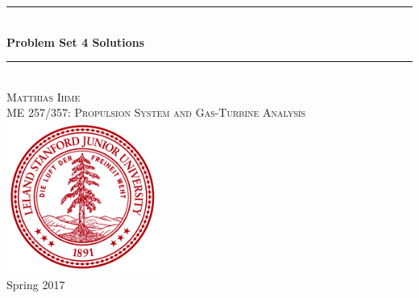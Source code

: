 \documentclass[12pt]{article}
\begin{document}

\begin{titlepage}

\newcommand{\ddz}[1]{\frac{\mathrm{d} #1}{\mathrm{d} z}}
\newcommand{\HRule}{\rule{\linewidth}{0.5mm}} %

\center %
 

 




\HRule \\[1 cm]
{ \huge \bfseries Problem Set 4 Solutions}\\[0.4cm] %
\HRule \\[2cm]
 

\Large  \textsc{Matthias Ihme}\\[2cm] %
\textsc{\large ME 257/357: Propulsion System and Gas-Turbine Analysis}\\[2cm] %

\includegraphics[width=50mm]{stanford_seal.png}\\[2cm] %
{\large Spring 2017}%


\end{titlepage}
\end{document}
